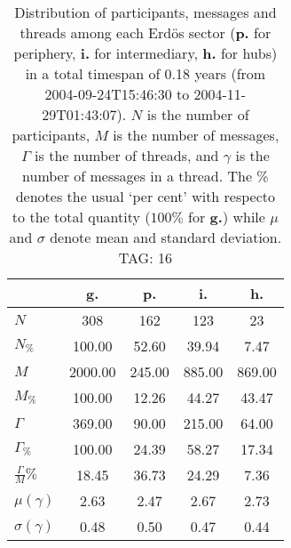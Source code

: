 \begin{table}[h!]
\begin{center}
\begin{tabular}{| l | c | c | c | c |}\hline
 & g. & p. & i. & h. \\\hline
$N$ & 308  & 162  & 123  & 23 \\\hline
$N_{\%}$ & 100.00  & 52.60  & 39.94  & 7.47 \\\hline
$M$ & 2000.00  & 245.00  & 885.00  & 869.00 \\\hline
$M_{\%}$ & 100.00  & 12.26  & 44.27  & 43.47 \\\hline
$\Gamma$ & 369.00  & 90.00  & 215.00  & 64.00 \\\hline
$\Gamma_{\%}$ & 100.00  & 24.39  & 58.27  & 17.34 \\\hline
$\frac{\Gamma}{M}\%$ & 18.45  & 36.73  & 24.29  & 7.36 \\\hline
$\mu(\gamma)$ & 2.63  & 2.47  & 2.67  & 2.73 \\\hline
$\sigma(\gamma)$ & 0.48  & 0.50  & 0.47  & 0.44 \\\hline
\end{tabular}
\caption{Distribution of participants, messages and threads among each Erd\"os sector ({\bf p.} for periphery, {\bf i.} for intermediary, 
    {\bf h.} for hubs) in a total timespan of 0.18 years (from 2004-09-24T15:46:30 to 2004-11-29T01:43:07). $N$ is the number of participants, $M$ is the number of messages, $\Gamma$ is the number of threads, and $\gamma$ is the number of messages in a thread.
    The \% denotes the usual `per cent' with respecto to the total quantity ($100\%$ for {\bf g.})
    while $\mu$ and $\sigma$ denote mean and standard deviation. TAG: 16}
\end{center}
\end{table}